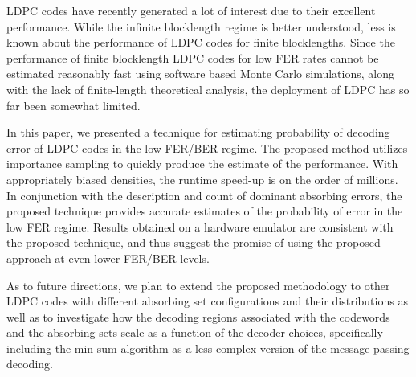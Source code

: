 LDPC codes have recently generated a lot of interest due to their
excellent performance. While the infinite blocklength regime is better
understood, less is known about the performance of LDPC codes for
finite blocklengths. Since the performance of finite blocklength LDPC
codes for low FER rates cannot be estimated reasonably fast using
software based Monte Carlo simulations, along with the lack of
finite-length theoretical analysis, the deployment of LDPC has so far
been somewhat limited.

In this paper, we presented a technique for estimating probability of
decoding error of LDPC codes in the low FER/BER regime. The proposed
method utilizes importance sampling to quickly produce the estimate of
the performance. With appropriately biased densities, the runtime
speed-up is on the order of millions. In conjunction with the
description and count of dominant absorbing errors, the proposed
technique provides accurate estimates of the probability of error in
the low FER regime. Results obtained on a hardware emulator are
consistent with the proposed technique, and thus suggest the promise
of using the proposed approach at even lower FER/BER levels.

As to future directions, we plan to extend the proposed methodology to
other LDPC codes with different absorbing set configurations and their
distributions as well as to investigate how the decoding regions
associated with the codewords and the absorbing sets scale as a
function of the decoder choices, specifically including the min-sum
algorithm as a less complex version of the message passing decoding.

